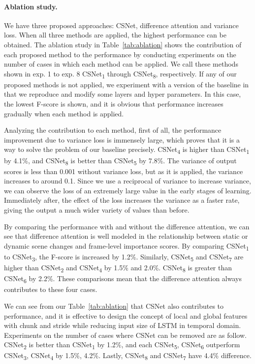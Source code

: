 \documentclass[letterpaper]{article} \usepackage{aaai19}  \usepackage{times}  \usepackage{helvet}  \usepackage{courier}  \usepackage{url}  \usepackage{graphicx}  \frenchspacing  \setlength{\pdfpagewidth}{8.5in}  \setlength{\pdfpageheight}{11in}
\newcommand{\tabref}[1]{Table~\ref{#1}}
\begin{document}
\paragraph{Ablation study.}
We have three proposed approaches: CSNet, difference attention and variance loss. When all three methods are applied, the highest performance can be obtained. The ablation study in \tabref{tab:ablation} shows the contribution of each proposed method to the performance by conducting experiments on the number of cases in which each method can be applied. We call these methods shown in exp. 1 to exp. 8 CSNet\textsubscript{1} through CSNet\textsubscript{8}, respectively. If any of our proposed methods is not applied, we experiment with a version of the baseline in that we reproduce and modify some layers and hyper parameters. In this case, the lowest F-score is shown, and it is obvious that performance increases gradually when each method is applied. 

Analyzing the contribution to each method, first of all, the performance improvement due to variance loss is immensely large, which proves that it is a way to solve the problem of our baseline precisely. CSNet\textsubscript{4} is higher than CSNet\textsubscript{1} by 4.1\%, and CSNet\textsubscript{8} is better than CSNet\textsubscript{5} by 7.8\%. The variance of output scores is less than 0.001 without variance loss, but as it is applied, the variance increases to around 0.1. Since we use a reciprocal of variance to increase variance, we can observe the loss of an extremely large value in the early stages of learning. Immediately after, the effect of the loss increases the variance as a faster rate, giving the output a much wider variety of values than before.

By comparing the performance with and without the difference attention, we can see that difference attention is well modeled in the relationship between static or dynamic scene changes and frame-level importance scores. By comparing CSNet\textsubscript{1} to CSNet\textsubscript{3}, the F-score is increased by 1.2\%. Similarly, CSNet\textsubscript{5} and CSNet\textsubscript{7} are higher than CSNet\textsubscript{2} and CSNet\textsubscript{4} by 1.5\% and 2.0\%. CSNet\textsubscript{8} is greater than CSNet\textsubscript{6} by 2.2\%. These comparisons mean that the difference attention always contributes to these four cases.

We can see from our \tabref{tab:ablation} that CSNet also contributes to performance, and it is effective to design the concept of local and global features with chunk and stride while reducing input size of LSTM in temporal domain. Experiments on the number of cases where CSNet can be removed are as follow. CSNet\textsubscript{2} is better than CSNet\textsubscript{1} by 1.2\%, and each CSNet\textsubscript{5}, CSNet\textsubscript{6} outperform CSNet\textsubscript{3}, CSNet\textsubscript{4} by 1.5\%, 4.2\%. Lastly, CSNet\textsubscript{8} and CSNet\textsubscript{7} have 4.4\% difference.
\end{document}
